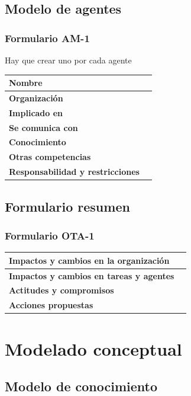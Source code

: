 \documentclass[a4paper,11pt]{article}
\begin{document}
		\subsection{Modelo de agentes}
			\subsubsection{Formulario AM-1}
			Hay que crear uno por cada agente
			\begin{center}
				\begin{tabular}{| l | l |}
					\hline
					\textbf{Nombre} & \\
					\hline
					\textbf{Organización} & \\
					\hline
					\textbf{Implicado en} & \\
					\hline
					\textbf{Se comunica con} & \\
					\hline
					\textbf{Conocimiento} & \\
					\hline
					\textbf{Otras competencias} & \\
					\hline
					\textbf{Responsabilidad y restricciones} & \\
					\hline
				\end{tabular}
			\end{center}
		\subsection{Formulario resumen}
			\subsubsection{Formulario OTA-1}
			\begin{center}
				\begin{tabular}{| l | l |}
					\hline
					\textbf{Impactos y cambios en la organización} & \\
					\hline
					\textbf{Impactos y cambios en tareas y agentes} & \\
					\hline
					\textbf{Actitudes y compromisos} & \\
					\hline
					\textbf{Acciones propuestas} & \\
					\hline
				\end{tabular}
			\end{center}
	\section{Modelado conceptual}
		\subsection{Modelo de conocimiento}
\end{document}
